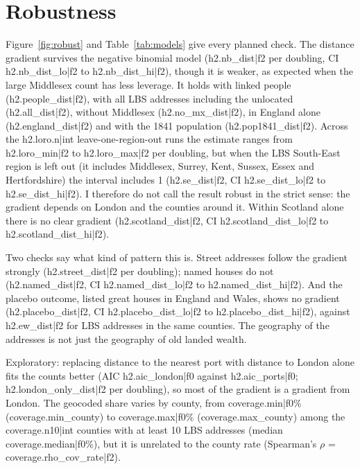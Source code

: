 \documentclass[11pt,a4paper]{article}
\begin{document}
\section{Robustness}\label{sec:robust}
Figure~\ref{fig:robust} and Table~\ref{tab:models} give every planned check. The distance gradient survives the negative binomial model ({{h2.nb_dist|f2}} per doubling, CI {{h2.nb_dist_lo|f2}} to {{h2.nb_dist_hi|f2}}), though it is weaker, as expected when the large Middlesex count has less leverage. It holds with linked people ({{h2.people_dist|f2}}), with all LBS addresses including the unlocated ({{h2.all_dist|f2}}), without Middlesex ({{h2.no_mx_dist|f2}}), in England alone ({{h2.england_dist|f2}}) and with the 1841 population ({{h2.pop1841_dist|f2}}). Across the {{h2.loro.n|int}} leave-one-region-out runs the estimate ranges from {{h2.loro_min|f2}} to {{h2.loro_max|f2}} per doubling, but when the LBS South-East region is left out (it includes Middlesex, Surrey, Kent, Sussex, Essex and Hertfordshire) the interval includes 1 ({{h2.se_dist|f2}}, CI {{h2.se_dist_lo|f2}} to {{h2.se_dist_hi|f2}}). I therefore do not call the result robust in the strict sense: the gradient depends on London and the counties around it. Within Scotland alone there is no clear gradient ({{h2.scotland_dist|f2}}, CI {{h2.scotland_dist_lo|f2}} to {{h2.scotland_dist_hi|f2}}).

Two checks say what kind of pattern this is. Street addresses follow the gradient strongly ({{h2.street_dist|f2}} per doubling); named houses do not ({{h2.named_dist|f2}}, CI {{h2.named_dist_lo|f2}} to {{h2.named_dist_hi|f2}}). And the placebo outcome, listed great houses in England and Wales, shows no gradient ({{h2.placebo_dist|f2}}, CI {{h2.placebo_dist_lo|f2}} to {{h2.placebo_dist_hi|f2}}), against {{h2.ew_dist|f2}} for LBS addresses in the same counties. The geography of the addresses is not just the geography of old landed wealth.

Exploratory: replacing distance to the nearest port with distance to London alone fits the counts better (AIC {{h2.aic_london|f0}} against {{h2.aic_ports|f0}}; {{h2.london_only_dist|f2}} per doubling), so most of the gradient is a gradient from London. The geocoded share varies by county, from {{coverage.min|f0}}\% ({{coverage.min_county}}) to {{coverage.max|f0}}\% ({{coverage.max_county}}) among the {{coverage.n10|int}} counties with at least 10 LBS addresses (median {{coverage.median|f0}}\%), but it is unrelated to the county rate (Spearman's $\rho$ = {{coverage.rho_cov_rate|f2}}).
\end{document}
